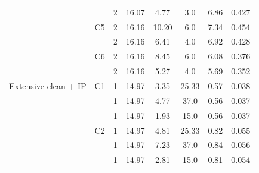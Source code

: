 {\begin{longtable}{llcccccc}
   &  & 2 & 16.07 & 4.77 & 3.0 & 6.86 & 0.427 \\
  \addlinespace[2pt]
   & C5 & 2 & 16.16 & 10.20 & 6.0 & 7.34 & 0.454 \\
   &  & 2 & 16.16 & 6.41 & 4.0 & 6.92 & 0.428 \\
  \addlinespace[2pt]
   & C6 & 2 & 16.16 & 8.45 & 6.0 & 6.08 & 0.376 \\
   &  & 2 & 16.16 & 5.27 & 4.0 & 5.69 & 0.352 \\
  \midrule
  Extensive clean + IP & C1 & 1 & 14.97 & 3.35 & 25.33 & 0.57 & 0.038 \\
   &  & 1 & 14.97 & 4.77 & 37.0 & 0.56 & 0.037 \\
   &  & 1 & 14.97 & 1.93 & 15.0 & 0.56 & 0.037 \\
  \addlinespace[2pt]
   & C2 & 1 & 14.97 & 4.81 & 25.33 & 0.82 & 0.055 \\
   &  & 1 & 14.97 & 7.23 & 37.0 & 0.84 & 0.056 \\
   &  & 1 & 14.97 & 2.81 & 15.0 & 0.81 & 0.054 \\
\end{longtable}}
